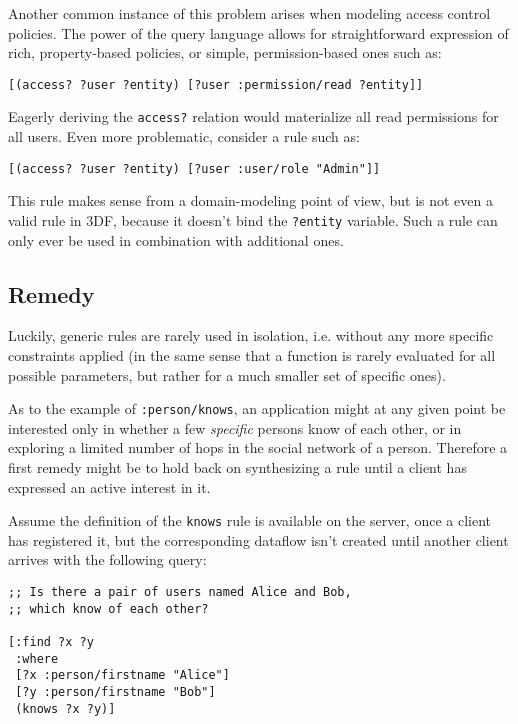 \documentclass[../catalog.tex]{subfiles}
\begin{document}
Another common instance of this problem arises when modeling access
control policies. The power of the query language allows for
straightforward expression of rich, property-based policies, or
simple, permission-based ones such as:

\begin{verbatim}
[(access? ?user ?entity) [?user :permission/read ?entity]]
\end{verbatim}

Eagerly deriving the \texttt{access?} relation would materialize all
read permissions for all users. Even more problematic, consider a rule
such as:

\begin{verbatim}
[(access? ?user ?entity) [?user :user/role "Admin"]]
\end{verbatim}

This rule makes sense from a domain-modeling point of view, but is not
even a valid rule in 3DF, because it doesn't bind the \texttt{?entity}
variable. Such a rule can only ever be used in combination with
additional ones.

\subsection{Remedy}

Luckily, generic rules are rarely used in isolation, i.e. without any
more specific constraints applied (in the same sense that a function
is rarely evaluated for all possible parameters, but rather for a much
smaller set of specific ones).

As to the example of \texttt{:person/knows}, an application might at
any given point be interested only in whether a few \emph{specific}
persons know of each other, or in exploring a limited number of hops
in the social network of a person. Therefore a first remedy might be
to hold back on synthesizing a rule until a client has expressed an
active interest in it.

Assume the definition of the \texttt{knows} rule is available on the
server, once a client has registered it, but the corresponding
dataflow isn't created until another client arrives with the following
query:

\begin{verbatim}
;; Is there a pair of users named Alice and Bob, 
;; which know of each other?

[:find ?x ?y
 :where
 [?x :person/firstname "Alice"]
 [?y :person/firstname "Bob"]
 (knows ?x ?y)]
\end{verbatim}
\end{document}
